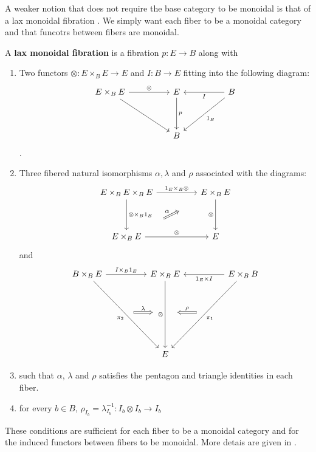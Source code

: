 A weaker notion that does not require the base category to be monoidal is that of a lax monoidal fibration \cite{zawadowski}. We simply want each fiber to be a monoidal category and that funcotrs between fibers are monoidal.
\begin{defn}
A \textbf{lax monoidal fibration} is a fibration $p : E \to B$ along with
\begin{enumerate}
\item Two functors $\otimes : E \times_{B} E \to E$ and $I : B \to E$ fitting into the following diagram:
\[
\ti
E \times_{B} E \ar[r, "\otimes"] \ar[rd] & E \ar[d, "p"] & B \ar[l, "I"] \ar[ld, "1_B"] \\
& B &
\kz
\].
\item Three fibered natural isomorphisms $\alpha, \lambda$ and $\rho$ associated with the diagrams:
\[
\ti
E \times_B E \times_B E \ar[r, "1_E \times_B \otimes"] \ar[d, "\otimes \times_B 1_E"] & E \times_B E \ar[d, "\otimes", swap] \\
E \times_B E \ar[r, "\otimes"] \ar[ru, "\alpha", Rightarrow, shorten <=30pt,shorten >=30pt]  & E
\kz
\]
and
\[
\ti
B \times_B E \ar[r, "I \times_B 1_{E}"] \ar[rdd, "\pi_2",swap] & E \times_B E  \ar[dd, "\otimes",swap] & E \times_B B \ar[ldd, "\pi_1"] \ar[l, "1_E \times I"] \\
\ar[r, "\lambda", xshift=20 pt, Rightarrow, shorten <=30pt, shorten >=30pt] & {}& \ar[l, "\rho", Rightarrow, xshift=-20pt, shorten <=30pt, shorten >=30pt,swap] \\
  & E &  
\kz
\]
\item such that $\alpha$, $\lambda$ and $\rho$ satisfies the pentagon and triangle identities in each fiber.
\item for every $b \in B$, $\rho_{I_b} = \lambda^{-1}_{I_b} : I_b \otimes I_b \to I_b$
\end{enumerate}
\end{defn}
These conditions are sufficient for each fiber to be a monoidal category and for the induced functors between fibers to be monoidal. More detais are given in \cite{zawadowski}.